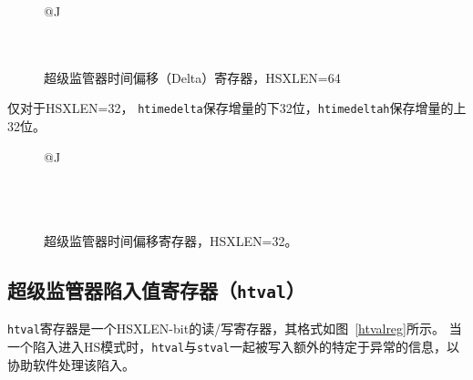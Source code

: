 \begin{figure*}[h!]
{\footnotesize
\begin{center}
\begin{tabular}{@{}J}
 \\
\hline
{} \\
 \\
\end{tabular}
\end{center}
}
\vspace{-0.1in}
\caption{ 超级监管器时间偏移（Delta）寄存器，HSXLEN=64
}
\label{hdeltareg}
\end{figure*}

仅对于HSXLEN=32， {\tt htimedelta}保存增量的下32位，{\tt htimedeltah}保存增量的上32位。

\begin{figure*}[h!]
{\footnotesize
\begin{center}
\begin{tabular}{@{}J}
 \\
\hline
{} \\
\hline
{} \\
 \\
\end{tabular}
\end{center}
}
\vspace{-0.1in}
\caption{超级监管器时间偏移寄存器，HSXLEN=32。
}
\label{hdeltahreg}
\end{figure*}

\subsection{超级监管器陷入值寄存器（{\tt htval}）}

{\tt htval}寄存器是一个HSXLEN-bit的读/写寄存器，其格式如图~\ref{htvalreg}所示。
当一个陷入进入HS模式时，{\tt htval}与{\tt stval}一起被写入额外的特定于异常的信息，以协助软件处理该陷入。


